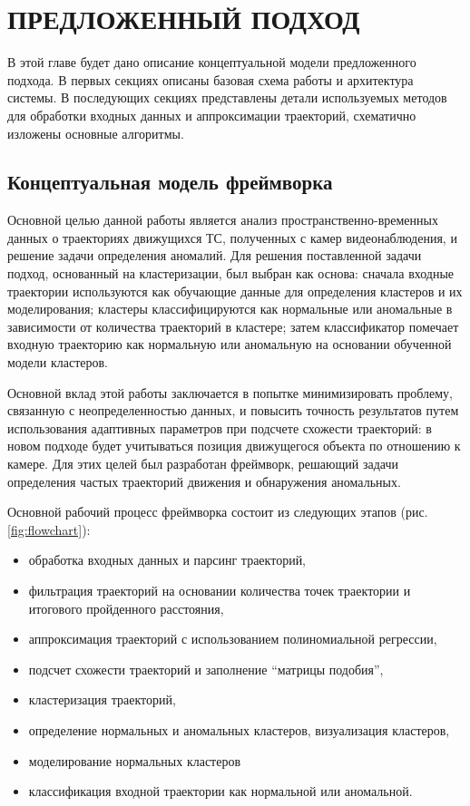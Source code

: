 \chapter{ПРЕДЛОЖЕННЫЙ ПОДХОД}
\label{ch:ПРЕДЛОЖЕННЫЙ ПОДХОД}

В этой главе будет дано описание концептуальной модели предложенного подхода. В первых секциях описаны базовая схема работы и архитектура системы. В последующих секциях представлены детали используемых методов для обработки входных данных и аппроксимации траекторий, схематично изложены основные алгоритмы.

\section{Концептуальная модель фреймворка}
\label{ch:Концептуальная модель фреймворка}

Основной целью данной работы является анализ пространственно-временных данных о траекториях движущихся ТС, полученных с камер видеонаблюдения, и решение задачи определения аномалий. Для решения поставленной задачи подход, основанный на кластеризации, был выбран как основа: сначала входные траектории используются как обучающие данные для определения кластеров и их моделирования; кластеры классифицируются как нормальные или аномальные в зависимости от количества траекторий в кластере; затем классификатор помечает входную траекторию как нормальную или аномальную на основании обученной модели кластеров.

Основной вклад этой работы заключается в попытке минимизировать проблему, связанную с неопределенностью данных, и повысить точность результатов путем использования адаптивных параметров при подсчете схожести траекторий: в новом подходе будет учитываться позиция движущегося объекта по отношению к камере. Для этих целей был разработан фреймворк, решающий задачи определения частых траекторий движения и обнаружения аномальных.

Основной рабочий процесс фреймворка состоит из следующих этапов (рис. \ref{fig:flowchart}):
\begin{itemize}
	\setlength\itemsep{-0.5em}
	\item обработка входных данных и парсинг траекторий,
	\item фильтрация траекторий на основании количества точек траектории и итогового пройденного расстояния,
	\item аппроксимация траекторий с использованием полиномиальной регрессии,
	\item подсчет схожести траекторий и заполнение ``матрицы подобия'',
	\item кластеризация траекторий,
	\item определение нормальных и аномальных кластеров, визуализация кластеров,
	\item моделирование нормальных кластеров
	\item классификация входной траектории как нормальной или аномальной.
\end{itemize}

